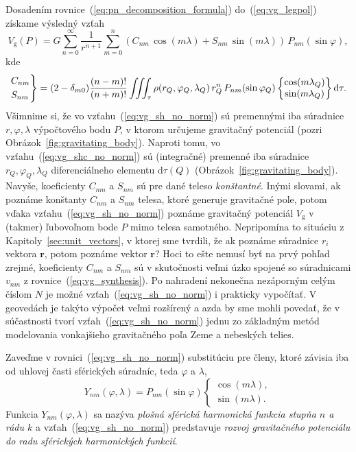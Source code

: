\documentclass[a4paper, 12pt]{book}
\newcommand{\diff}{\mathrm d}
\newcommand{\gidx}{\mathrm g}
\let\vec\mathbf
\begin{document}
Dosadením rovnice~(\ref{eq:pn_decomposition_formula}) do~(\ref{eq:vg_legpol}) 
získame výsledný vzťah
%
\begin{equation}
\label{eq:vg_sh_no_norm}
V_\gidx(P) = G \sum_{n = 0}^\infty \frac{1}{r^{n + 1}} \sum_{m = 0}^{n} \left( 
C_{nm} \, \cos(m\lambda) + S_{nm} \, \sin(m\lambda)\right) \, 
P_{nm}(\sin\varphi){,}
\end{equation}
%
kde
%
\begin{equation}
\label{eq:vg_shc_no_norm}
\begin{rcases}
C_{nm}\\
S_{nm}
\end{rcases}
= (2 - \delta_{m0}) \frac{(n - m)!}{(n + m)!} \iiint_{\tau} \rho(r_Q, 
\varphi_Q, \lambda_Q) \, r_Q^n \, P_{nm}(\sin\varphi_Q)
%
\begin{Bmatrix}
\cos(m\lambda_Q)\\
\sin(m\lambda_Q)
\end{Bmatrix}
%
\diff\tau{.}
\end{equation}
%
Všimnime si, že vo vzťahu~(\ref{eq:vg_sh_no_norm}) sú premennými iba súradnice 
$r, \varphi, \lambda$ výpočtového bodu $P$, v ktorom určujeme gravitačný 
potenciál (pozri Obrázok~\ref{fig:gravitating_body}).  Naproti tomu, vo 
vzťahu~(\ref{eq:vg_shc_no_norm}) sú (integračné) premenné iba súradnice 
$r_Q,\varphi_Q, \lambda_Q$ diferenciálneho elementu $\diff\tau(Q)$ 
(Obrázok~\ref{fig:gravitating_body}).  Navyše, koeficienty $C_{nm}$ a $S_{nm}$ 
sú pre dané teleso \emph{konštantné}.  Inými slovami, ak poznáme konštanty 
$C_{nm}$ a $S_{nm}$ telesa, ktoré generuje gravitačné pole, potom vďaka 
vzťahu~(\ref{eq:vg_sh_no_norm}) poznáme gravitačný potenciál $V_\gidx$ 
v (takmer) ľubovoľnom bode $P$ mimo telesa samotného.  Nepripomína to situáciu 
z Kapitoly~\ref{sec:unit_vectors}, v ktorej sme tvrdili, že ak poznáme 
súradnice $r_i$ vektora $\vec r$, potom poznáme vektor $\vec r$?  Hoci to ešte 
nemusí byť na prvý pohľad zrejmé, koeficienty $C_{nm}$ a $S_{nm}$ sú 
v skutočnosti veľmi úzko spojené so súradnicami $v_{nm}$ 
z rovnice~(\ref{eq:vg_synthesis}).  Po nahradení nekonečna nezáporným celým 
číslom $N$ je možné vzťah~(\ref{eq:vg_sh_no_norm}) i prakticky vypočítať.  
V geovedách je takýto výpočet veľmi rozšírený a azda by sme mohli povedať, že 
v súčastnosti tvorí vzťah~(\ref{eq:vg_sh_no_norm}) jednu zo základným metód 
modelovania vonkajšieho gravitačného poľa Zeme a nebeských telies.

Zaveďme v rovnici~(\ref{eq:vg_sh_no_norm}) substitúciu pre členy, ktoré závisia 
iba od uhlovej časti sférických súradníc, teda $\varphi$ a $\lambda$,
%
\begin{equation}
Y_{nm}(\varphi, \lambda) = P_{nm}(\sin\varphi)
%
\begin{cases}
\cos(m\lambda){,}\\
\sin(m\lambda){.}
\end{cases}
\end{equation}
%
Funkcia $Y_{nm}(\varphi, \lambda)$ sa nazýva \emph{plošná sférická harmonická 
funkcia stupňa $n$ a rádu $k$} a vzťah~(\ref{eq:vg_sh_no_norm}) predstavuje 
\emph{rozvoj gravitačného potenciálu do radu sférických harmonických funkcií}.
\end{document}
